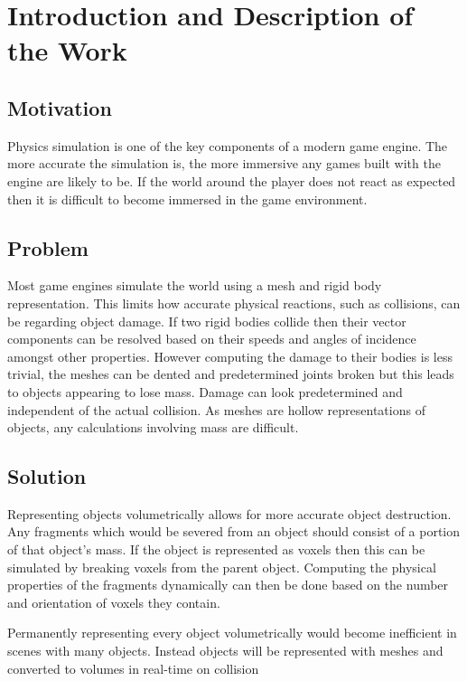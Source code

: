 
\section{Introduction and Description of the Work}

\subsection{Motivation}

Physics simulation is one of the key components of a modern game engine. The more accurate the simulation is, the more immersive any games built with the engine are likely to be. If the world around the player does not react as expected then it is difficult to become immersed in the game environment.

\subsection{Problem}

Most game engines simulate the world using a mesh and rigid body representation. This limits how accurate physical reactions, such as collisions, can be regarding object damage. If two rigid bodies collide then their vector components can be resolved based on their speeds and angles of incidence amongst other properties. However computing the damage to their bodies is less trivial, the meshes can be dented and predetermined joints broken but this leads to objects appearing to lose mass. Damage can look predetermined and independent of the actual collision. As meshes are hollow representations of objects, any calculations involving mass are difficult.

\subsection{Solution}

Representing objects volumetrically allows for more accurate object destruction. Any fragments which would be severed from an object should consist of a portion of that object's mass. If the object is represented as voxels then this can be simulated by breaking voxels from the parent object. Computing the physical properties of the fragments dynamically can then be done based on the number and orientation of voxels they contain\cite{AfD}.

Permanently representing every object volumetrically would become inefficient in scenes with many objects. Instead objects will be represented with meshes and converted to volumes in real-time on collision\cite{RTC}

